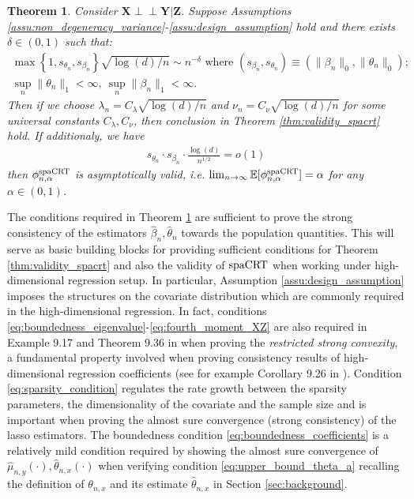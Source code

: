\documentclass[12pt]{article}
\newtheorem{theorem}{Theorem}
\theoremstyle{definition}
\newcommand{\indep}{\perp \!\!\! \perp}
\newcommand{\E}{\mathbb E}								%
\newcommand{\prx}{\bm X}								%
\newcommand{\prz}{\bm Z}								%
\newcommand{\pry}{{\bm Y}}								%
\newcommand{\spacrt}{\textnormal{spaCRT}}               %
\begin{document}
\begin{theorem}\label{thm:high_dim_glm_spacrt}
  Consider $\prx\indep\pry|\prz$. Suppose Assumptions \ref{assu:non_degeneracy_variance}-\ref{assu:design_assumption} hold and there exists $\delta\in(0,1)$ such that:
  \begin{align}
    \max\left\{1,s_{\theta_n},s_{\beta_n}\right\} \sqrt{\log(d)/n}\sim n^{-\delta}\text{ where }(s_{\beta_n},s_{\theta_n})\equiv (\|\beta_n\|_0,\|\theta_n\|_0);\label{eq:sparsity_condition}\\
    \sup_n\|\theta_n\|_1<\infty,\ \sup_n\|\beta_n\|_1<\infty.\label{eq:boundedness_coefficients}
  \end{align}
  Then if we choose $\lambda_n=C_{\lambda} \sqrt{\log(d)/n}$ and $\nu_n=C_{\nu}\sqrt{\log(d)/n}$ for some universal constants $C_\lambda,C_\nu$, then conclusion in Theorem \ref{thm:validity_spacrt} hold. If additionaly, we have 
  \begin{align}\label{eq:product_sparsity_condition}
    s_{\theta_n}\cdot s_{\beta_n}\cdot \frac{\log(d)}{n^{1/2}}=o(1)
  \end{align}
  then $\phi_{n,\alpha}^\mathrm{\spacrt}$ is asymptotically valid, i.e. $\lim_{n\rightarrow\infty}\E[\phi_{n,\alpha}^{\spacrt}]=\alpha$ for any $\alpha\in(0,1)$. 
\end{theorem}

The conditions required in Theorem \ref{thm:high_dim_glm_spacrt} are sufficient to prove the strong consistency of the estimators $\widehat{\beta}_n,\widehat{\theta}_n$ towards the population quantities. This will serve as basic building blocks for providing sufficient conditions for Theorem \ref{thm:validity_spacrt} and also the validity of $\spacrt$ when working under high-dimensional regression setup. In particular, Assumption \ref{assu:design_assumption} imposes the structures on the covariate distribution which are commonly required in the high-dimensional regression. In fact, conditions \eqref{eq:boundedness_eigenvalue}-\eqref{eq:fourth_moment_XZ} are also required in Example 9.17 and Theorem 9.36 in \citet{wainwright2019high} when proving the \textit{restricted strong convexity}, a fundamental property involved when proving consistency results of high-dimensional regression coefficients (see for example Corollary 9.26 in \citet{wainwright2019high}). Condition \eqref{eq:sparsity_condition} regulates the rate growth between the sparsity parameters, the dimensionality of the covariate and the sample size and is important when proving the almost sure convergence (strong consistency) of the lasso estimators. The boundedness condition \eqref{eq:boundedness_coefficients} is a relatively mild condition required by showing the almost sure convergence of $\widehat{\mu}_{n,y}(\cdot), \widehat{\theta}_{n,x}(\cdot)$ when verifying condition \eqref{eq:upper_bound_theta_a} recalling the definition of $\theta_{n,x}$ and its estimate $\widehat{\theta}_{n,x}$ in Section \ref{sec:background}.
\end{document}
